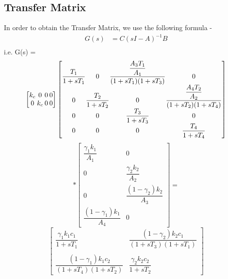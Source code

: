 \documentclass[10pt,a4paper, twocolumn]{article}
\begin{document}
\subsection{Transfer Matrix}
In order to obtain the Transfer Matrix, we use the following formula - 
\begin{align*}
  G(s) &= C (sI - A)^{-1} B \\
\end{align*}
i.e.
G(s) = 
\[
\setlength{\arraycolsep}{1pt}
\begin{bmatrix}
  k_c & 0 & 0 & 0 \\
  0 & k_c & 0 & 0 
\end{bmatrix}
\setlength{\arraycolsep}{0.2pt}
\begin{bmatrix}
  \dfrac{T_1}{1 + s T_1} & 0 & \dfrac{\dfrac{A_3 T_1}{A_1}}{(1 + s T_1)(1 + s T_3)} & 0 \\
  0 & \dfrac{T_2}{1 + s T_2} & 0 & \dfrac{\dfrac{A_4 T_2}{A_2}}{(1+s T_2)(1 + s T_4)} \\
  0 & 0 & \dfrac{T_3}{1 + s T_3} & 0 \\
  0 & 0 & 0 & \dfrac{T_4}{1 + s T_4}
\end{bmatrix}
\]
\[
*\begin{bmatrix}
  \dfrac{\gamma_1 k_1}{A_1} & 0 \\
  0 & \dfrac{\gamma_2 k_2}{A_2} \\
  0 & \dfrac{(1-\gamma_2) k_2}{A_3} \\
  \dfrac{(1-\gamma_1) k_1}{A_4} & 0
\end{bmatrix} =
\]
\[
\begin{bmatrix}
  \dfrac{\gamma_1 k_1 c_1}{1 + s T_1} & \dfrac{(1-\gamma_2)k_2 c_1}{(1 + s T_3)(1 + s T_1)} \\\\
  \dfrac{(1-\gamma_1) k_1 c_2}{(1 + s T_4)(1 + s T_2)} & \dfrac{\gamma_2 k_2 c_2}{1 + s T_2}
\end{bmatrix}
\]
\end{document}
